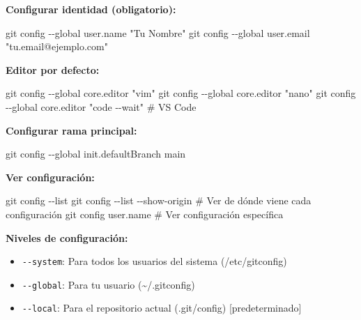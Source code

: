 \documentclass[
  doc,
  floatsintext,
  longtable,
  a4paper,
  nolmodern,
  notxfonts,
  notimes,
  12pt,
  colorlinks=true,linkcolor=blue,citecolor=blue,urlcolor=blue]{apa7}
\newenvironment{Shaded}{\begin{snugshade}}{\end{snugshade}}
\newcommand{\AttributeTok}[1]{\textcolor[rgb]{0.40,0.45,0.13}{#1}}
\newcommand{\CommentTok}[1]{\textcolor[rgb]{0.37,0.37,0.37}{#1}}
\newcommand{\FunctionTok}[1]{\textcolor[rgb]{0.28,0.35,0.67}{#1}}
\newcommand{\NormalTok}[1]{\textcolor[rgb]{0.00,0.23,0.31}{#1}}
\newcommand{\StringTok}[1]{\textcolor[rgb]{0.13,0.47,0.30}{#1}}
\providecommand{\tightlist}{%
  \setlength{\itemsep}{0pt}\setlength{\parskip}{0pt}}
\begin{document}
\textbf{Configurar identidad (obligatorio):}

\begin{Shaded}
\begin{Highlighting}[]
\FunctionTok{git}\NormalTok{ config }\AttributeTok{{-}{-}global}\NormalTok{ user.name }\StringTok{"Tu Nombre"}
\FunctionTok{git}\NormalTok{ config }\AttributeTok{{-}{-}global}\NormalTok{ user.email }\StringTok{"tu.email@ejemplo.com"}
\end{Highlighting}
\end{Shaded}

\textbf{Editor por defecto:}

\begin{Shaded}
\begin{Highlighting}[]
\FunctionTok{git}\NormalTok{ config }\AttributeTok{{-}{-}global}\NormalTok{ core.editor }\StringTok{"vim"}
\FunctionTok{git}\NormalTok{ config }\AttributeTok{{-}{-}global}\NormalTok{ core.editor }\StringTok{"nano"}
\FunctionTok{git}\NormalTok{ config }\AttributeTok{{-}{-}global}\NormalTok{ core.editor }\StringTok{"code {-}{-}wait"}  \CommentTok{\# VS Code}
\end{Highlighting}
\end{Shaded}

\textbf{Configurar rama principal:}

\begin{Shaded}
\begin{Highlighting}[]
\FunctionTok{git}\NormalTok{ config }\AttributeTok{{-}{-}global}\NormalTok{ init.defaultBranch main}
\end{Highlighting}
\end{Shaded}

\textbf{Ver configuración:}

\begin{Shaded}
\begin{Highlighting}[]
\FunctionTok{git}\NormalTok{ config }\AttributeTok{{-}{-}list}
\FunctionTok{git}\NormalTok{ config }\AttributeTok{{-}{-}list} \AttributeTok{{-}{-}show{-}origin}  \CommentTok{\# Ver de dónde viene cada configuración}
\FunctionTok{git}\NormalTok{ config user.name             }\CommentTok{\# Ver configuración específica}
\end{Highlighting}
\end{Shaded}

\textbf{Niveles de configuración:}

\begin{itemize}
\tightlist
\item
  \texttt{-\/-system}: Para todos los usuarios del sistema
  (/etc/gitconfig)
\item
  \texttt{-\/-global}: Para tu usuario (\textasciitilde/.gitconfig)
\item
  \texttt{-\/-local}: Para el repositorio actual (.git/config)
  {[}predeterminado{]}
\end{itemize}
\end{document}
